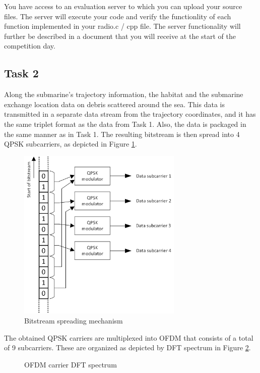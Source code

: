 \documentclass{article}
\begin{document}
You have access to an evaluation server to which you can upload your source files.
The server will execute your code and verify the functionlity of each function implemented in your \textsf{radio.c / cpp} file.
The server functionality will further be described in a document that you will receive at the start of the competition day.

\subsection{Task 2}

Along the submarine's trajectory information, the habitat and the submarine exchange location data on debris scattered around the sea. This data is transmitted in a separate data stream from the trajectory coordinates, and it has the same triplet format as the data from Task 1. Also, the data is packaged in the same manner as in Task 1. The resulting bitstream is then spread into 4 QPSK subcarriers, as depicted in Figure \ref{fig:spread}.
\begin{figure}[h!]
	\centering
	\includegraphics[width=0.7\textwidth]{Images/spread.png}
	\caption{Bitstream spreading mechanism}
	\label{fig:spread}
\end{figure}

The obtained QPSK carriers are multiplexed into OFDM that consists of a total of 9 subcarriers. These are organized as depicted by DFT spectrum in Figure \ref{fig:dft}.
\begin{figure}[h!]
	\centering
	\caption{OFDM carrier DFT spectrum}
	\label{fig:dft}
\end{figure}
\end{document}
